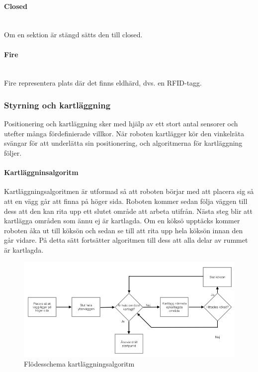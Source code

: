 \documentclass[a4paper,12pt,fleqn]{article}
\begin{document}
\paragraph{Closed} 
~\\
Om en sektion är stängd sätts den till closed.

\paragraph{Fire} 
~\\
Fire representera plats där det finns eldhärd, dvs. en RFID-tagg. 
\newpage

\subsubsection{Styrning och kartläggning}
Positionering och kartläggning sker med hjälp av ett stort antal sensorer och utefter många fördefinierade villkor. När roboten kartlägger kör den vinkelräta svängar för att underlätta sin positionering, och algoritmerna för kartläggning följer. 

\paragraph{Kartläggninsalgoritm}

Kartläggningsalgoritmen är utformad så att roboten börjar med att placera sig så att en vägg går att finna på höger sida. Roboten kommer sedan följa väggen till dess att den kan rita upp ett slutet område att arbeta utifrån. Nästa steg blir att kartlägga områden som ännu ej är kartlagda. Om en köksö upptäcks kommer roboten åka ut till köksön och sedan se till att rita upp hela köksön innan den går vidare. På detta sätt fortsätter algoritmen till dess att alla delar av rummet är kartlagda. 

\begin{figure}[htp] %
  \begin{center}
  \includegraphics[keepaspectratio=true,width=0.8\linewidth]{bilder/Flode_kartritning.jpg}  %
  \end{center}
  \caption{Flödesschema kartläggningsalgoritm} %
  \label{fig:map} %
\end{figure}
\end{document}
